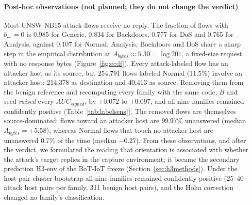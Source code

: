 \documentclass[preprint,12pt]{elsarticle}
\begin{document}
\paragraph{Post-hoc observations (not planned; they do not change the verdict)} Most UNSW-NB15 attack flows receive no reply. The fraction of flows with $b_{\leftarrow}=0$ is 0.985 for Generic, 0.834 for Backdoors, 0.777 for DoS and 0.765 for Analysis, against 0.107 for Normal. Analysis, Backdoors and DoS share a sharp step in the empirical distribution at $A_{bytes}\approx 5.30=\log 201$, a fixed-size request with no response bytes (Figure~\ref{fig:ecdf}). Every attack-labeled flow has an attacker host as its source, but 254{,}791 flows labeled Normal (11.5\%) involve an attacker host: 214{,}378 as destination and 40{,}413 as source. Removing them from the benign reference and recomputing every family with the same code, $B$ and seed \emph{raised} every $AUC_{signed}$, by $+0.072$ to $+0.097$, and all nine families remained confidently positive (Table~\ref{tab:labelsens}). The removed flows are themselves source-dominated: flows toward an attacker host are 99.97\% unanswered (median $A_{bytes}=+5.58$), whereas Normal flows that touch no attacker host are unanswered 0.7\% of the time (median $-0.27$). From these observations, and after the verdict, we formulated the reading that orientation is associated with whether the attack's target replies in the capture environment; it became the secondary prediction H3-env of the BoT-IoT freeze (Section~\ref{sec:h3methods}). Under the host-pair cluster bootstrap all nine families remained confidently positive (25--40 attack host pairs per family, 311 benign host pairs), and the Holm correction changed no family's classification.
\end{document}
